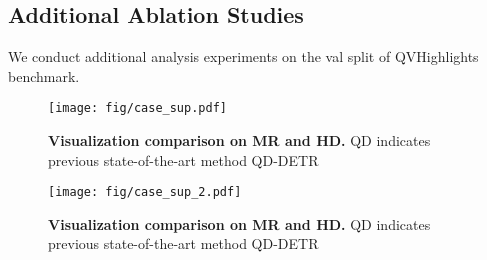 \documentclass[10pt,twocolumn,letterpaper]{article}
\begin{document}
\subsection{Additional Ablation Studies}
We conduct additional analysis experiments on the val split of QVHighlights benchmark.
\begin{figure*}[ht]
\centering
    \texttt{[image: fig/case\_sup.pdf]}
    \caption{\textbf{Visualization comparison on MR and HD.} QD indicates previous state-of-the-art method QD-DETR~\cite{qddetr}}
    \label{fig:sup_case_show}
\end{figure*}

\begin{figure*}[ht]
\centering
    \texttt{[image: fig/case\_sup\_2.pdf]}
    \caption{\textbf{Visualization comparison on MR and HD.} QD indicates previous state-of-the-art method QD-DETR~\cite{qddetr}}
    \label{fig:sup_case_show_2}
\end{figure*}
\end{document}

